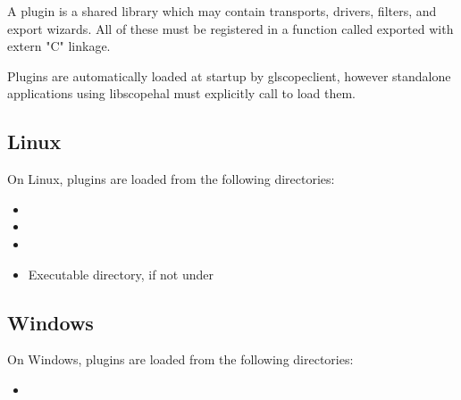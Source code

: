 A plugin is a shared library which may contain transports, drivers, filters, and export wizards. All of these must be
registered in a function called  exported with extern "C" linkage.

Plugins are automatically loaded at startup by glscopeclient, however standalone applications using libscopehal must
explicitly call  to load them.

\subsection{Linux}

On Linux, plugins are loaded from the following directories:

\begin{itemize}
\item {}
\item {}
\item {}
\item Executable directory, if not under 
\end{itemize}

\subsection{Windows}

On Windows, plugins are loaded from the following directories:

\begin{itemize}
\item {}
\end{itemize}
